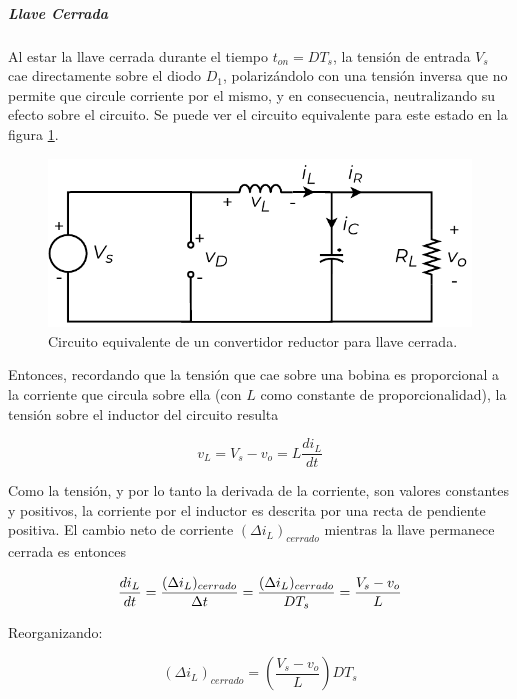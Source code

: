 \subparagraph{Llave Cerrada}

Al estar la llave cerrada durante el tiempo $t_{on} = DT_s$, la tensión de entrada $V_s$ cae directamente sobre el diodo $D_1$, polarizándolo con una tensión inversa que no permite que circule corriente por el mismo, y en consecuencia, neutralizando su efecto sobre el circuito. Se puede ver el circuito equivalente para este estado en la figura \ref{reductor_llave_cerrada}.\\

\begin{figure}[H]
    \centering
    \includegraphics[scale=0.6]{Imagenes/Reductor Llave Cerrada.pdf}
    \caption{Circuito equivalente de un convertidor reductor para llave cerrada.}
    \label{reductor_llave_cerrada}
\end{figure}

Entonces, recordando que la tensión que cae sobre una bobina es proporcional a la corriente que circula sobre ella (con $L$ como constante de proporcionalidad), la tensión sobre el inductor del circuito resulta

\begin{equation}\label{ec_tensionL_cerrada}
    v_L = V_s - v_o = L\frac{di_L}{dt}
\end{equation}

Como la tensión, y por lo tanto la derivada de la corriente, son valores constantes y positivos, la corriente por el inductor es descrita por una recta de pendiente positiva. El cambio neto de corriente $(\Delta i_L)_{cerrado}$ mientras la llave permanece cerrada es entonces

\begin{equation*}
    \frac{di_L}{dt} = \frac{(\Delta i_L)_{cerrado}}{\Delta t} = \frac{(\Delta i_L)_{cerrado}}{DT_s} = \frac{V_s - v_o}{L}\\
\end{equation*}

Reorganizando:

\begin{equation}\label{deltaiL_cerrada}
    \boxed{
        (\Delta i_L)_{cerrado} = \left(\frac{V_s - v_o}{L}\right)DT_s
    }
\end{equation}

